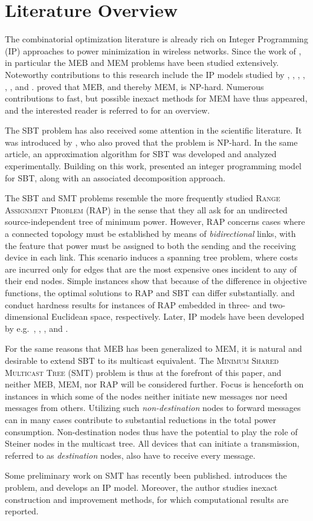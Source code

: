 \section{Literature Overview}
\label{sec:literature}
The combinatorial optimization literature is already rich on Integer Programming (IP) approaches to power minimization in wireless networks.
Since the work of \citet{Wieseltier00onthe}, in particular the MEB and MEM problems have been studied extensively.
Noteworthy contributions to this research include the IP models studied by \citet{das03},
\citet{altinkemer05}, \citet{leggieri08}, \citet{yuan05}, \citet{yuan08}, \citet{bauer08}, and \citet{montemanni11}.
\citet{cagalj02} proved that MEB, and thereby MEM, is NP-hard.
Numerous contributions to fast, but possible inexact methods for MEM have thus appeared, and the interested reader is referred to \citep{hsiao13} for an overview.

The SBT problem has also received some attention in the scientific literature.
It was introduced by \citet{Papadimitriou06SBT}, who also proved that the problem is NP-hard.
In the same article, an approximation algorithm for SBT was developed and analyzed experimentally.
Building on this work, \citet{Haugland12Dual} presented an integer programming model for SBT, along with an associated decomposition approach.

The SBT and SMT problems resemble the more frequently studied \textsc{Range Assignment Problem} (RAP) in the sense that they all ask for an undirected source-independent tree of minimum power.
However, RAP concerns cases where a connected topology must be established by means of \emph{bidirectional} links,
with the feature that power must be assigned to both the sending and the receiving device in each link.
This scenario induces a spanning tree problem, where costs are incurred only for edges that are the most expensive ones incident to any of their end nodes.
Simple instances \citep{Haugland12Dual} show that because of the difference in objective functions, the optimal solutions to RAP and SBT can differ substantially.
\citet{kirousis97} and \citet{clementi99} conduct
hardness results for instances of RAP embedded in three- and two-dimensional Euclidean space, respectively.
Later, IP models have been developed by e.g.\ \citet{althaus03}, \citet{montemanni04}, \citet{das05}, and \citet{Haugland11Compact}.

For the same reasons that MEB has been generalized to MEM, it is natural and desirable to extend SBT to its multicast equivalent.
The \textsc{Minimum Shared Multicast Tree} (SMT) problem is thus at the forefront of this paper,
and neither MEB, MEM, nor RAP will be considered further.
Focus is henceforth on instances in which some of the nodes neither initiate new messages nor need messages from others.
Utilizing such \emph{non-destination} nodes to forward messages can in many cases contribute to substantial reductions in the total power consumption.
Non-destination nodes thus have the potential to play the role of Steiner nodes in the multicast tree.
All devices that can initiate a transmission, referred to as \emph{destination} nodes, also have to receive every message.

Some preliminary work on SMT has recently been published.
\citet{ivanova16isco} introduces the problem, and develops an IP model.
Moreover, the author studies inexact construction and improvement methods, for which computational results are reported.
